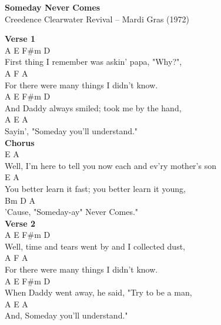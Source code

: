 \documentclass[a4paper]{article}
\begin{document}
    \begin{center}
        \textbf{Someday Never Comes}
        ~\\
        Creedence Clearwater Revival -- Mardi Gras (1972)
    \end{center}
    {
        \scriptsize
        \textbf{Verse 1}
        ~\\
        {
            \cutive
            \obeyspaces
A             E            F\#m           D   
\\
First thing I remember was askin' papa, "Why?",
\\
A                   F                A
\\
For there were many things I didn't know.
\\
A                E       F\#m             D
\\
And Daddy always smiled; took me by the hand,
\\
A                E        A
\\
Sayin', "Someday you'll understand."
\\

        }
        \textbf{Chorus}
        ~\\
        {
            \cutive
            \obeyspaces
E                                        A
\\
Well, I'm here to tell you now each and ev'ry mother's son
\\
E                             A
\\
You better learn it fast; you better learn it young,
\\
           Bm    D          A
\\
'Cause, "Someday-ay" Never Comes."
\\

        }
        \textbf{Verse 2}
        ~\\
        {
            \cutive
            \obeyspaces
A                         E      F\#m          D
\\
Well, time and tears went by and I collected dust,
\\
A                    F               A
\\
For there were many things I didn't know.
\\
A               E                F\#m         D
\\
When Daddy went away, he said, "Try to be a man, 
\\
     A        E          A
\\
And, Someday you'll understand."
\\

}}
\end{document}
